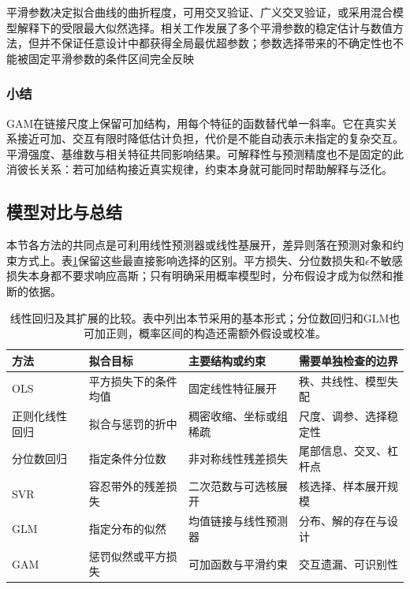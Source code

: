 平滑参数决定拟合曲线的曲折程度，可用交叉验证、广义交叉验证，或采用混合模型解释下的受限最大似然选择。相关工作发展了多个平滑参数的稳定估计与数值方法，但并不保证任意设计中都获得全局最优超参数；参数选择带来的不确定性也不能被固定平滑参数的条件区间完全反映

\subsubsection{小结}

GAM在链接尺度上保留可加结构，用每个特征的函数替代单一斜率。它在真实关系接近可加、交互有限时降低估计负担，代价是不能自动表示未指定的复杂交互。平滑强度、基维数与相关特征共同影响结果。可解释性与预测精度也不是固定的此消彼长关系：若可加结构接近真实规律，约束本身就可能同时帮助解释与泛化。

\subsection{模型对比与总结}
\label{sec:regression-linear-summary}

本节各方法的共同点是可利用线性预测器或线性基展开，差异则落在预测对象和约束方式上。表\ref{tab:regression-linear-comparison}保留这些最直接影响选择的区别。平方损失、分位数损失和$\epsilon$不敏感损失本身都不要求响应高斯；只有明确采用概率模型时，分布假设才成为似然和推断的依据。

\begin{table}[htbp]
  \centering
  \begin{tabularx}{\linewidth}{@{}l>{\RaggedRight\arraybackslash}X>{\RaggedRight\arraybackslash}X>{\RaggedRight\arraybackslash}X@{}}
    \toprule
    方法 & 拟合目标 & 主要结构或约束 & 需要单独检查的边界\\
    \midrule
    OLS & 平方损失下的条件均值 & 固定线性特征展开 & 秩、共线性、模型失配\\
    正则化线性回归 & 拟合与惩罚的折中 & 稠密收缩、坐标或组稀疏 & 尺度、调参、选择稳定性\\
    分位数回归 & 指定条件分位数 & 非对称线性残差损失 & 尾部信息、交叉、杠杆点\\
    SVR & 容忍带外的残差损失 & 二次范数与可选核展开 & 核选择、样本展开规模\\
    GLM & 指定分布的似然 & 均值链接与线性预测器 & 分布、解的存在与设计\\
    GAM & 惩罚似然或平方损失 & 可加函数与平滑约束 & 交互遗漏、可识别性\\
    \bottomrule
  \end{tabularx}
  \caption{线性回归及其扩展的比较。表中列出本节采用的基本形式；分位数回归和GLM也可加正则，概率区间的构造还需额外假设或校准。}
  \label{tab:regression-linear-comparison}
\end{table}

